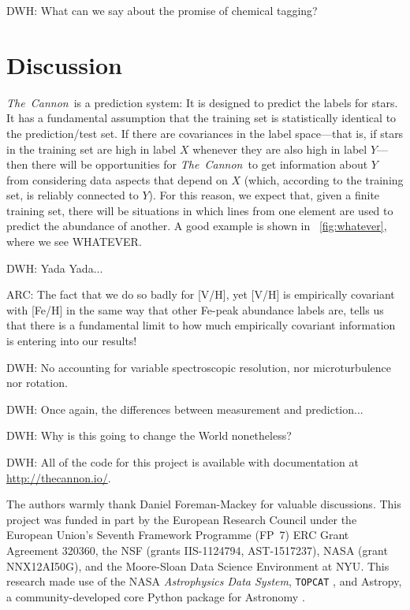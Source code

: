\documentclass[12pt,preprint]{aastex}
\newcommand{\project}[1]{\textsl{#1}}
\newcommand{\TheCannon}{\project{The~Cannon}}
\newcommand{\acronym}[1]{{\small{#1}}}
\begin{document}
DWH: What can we say about the promise of chemical tagging?

\section{Discussion}
\label{sec:discussion}




\TheCannon\ is a prediction system: It is designed to predict the labels for 
stars.  It has a fundamental assumption that the training set is statistically
identical to the prediction/test set.  If there are covariances in the label 
space---that is, if stars in the training set are high in label $X$ whenever
they are also high in label $Y$---then there will be opportunities for 
\TheCannon\ to get information about $Y$ from considering data aspects that 
depend on $X$ (which, according to the training set, is reliably connected to 
$Y$).  For this reason, we expect that, given a finite training set, there will
be situations in which lines from one element are used to predict the abundance
of another.  A good example is shown in \figurename~\ref{fig:whatever}, where we
see WHATEVER.

DWH: Yada Yada...


ARC: The fact that we do so badly for [V/H], yet [V/H] is empirically covariant with [Fe/H] in the same way that other Fe-peak abundance labels are, tells us that there is a fundamental limit to how much empirically covariant information is entering into our results!


DWH: No accounting for variable spectroscopic resolution, nor
microturbulence nor rotation.

DWH:  Once again, the differences between measurement and prediction...

DWH:  Why is this going to change the World nonetheless?

DWH: All of the code for this project is available with documentation
at \url{http://thecannon.io/}.

\acknowledgements
The authors warmly thank Daniel Foreman-Mackey for valuable discussions.
This project was funded in part by
  the European Research Council under the European Union's Seventh Framework 
  Programme (FP~7) \acronym{ERC} Grant Agreement 320360,
  the \acronym{NSF} (grants \acronym{IIS-1124794}, \acronym{AST-1517237}),
  \acronym{NASA} (grant \acronym{NNX12AI50G}), and 
  the Moore-Sloan Data Science Environment at \acronym{NYU}.
This research made use of 
  the \acronym{NASA} \project{Astrophysics Data System},
  \texttt{TOPCAT} \citep{Taylor_2005}, and 
  Astropy, a community-developed core Python package for Astronomy \citep{astropy}.
\end{document}
